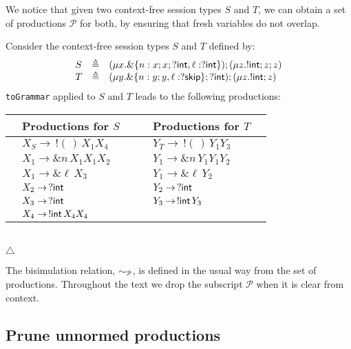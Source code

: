 We notice that given two context-free session types $S$ and $T$, we can obtain 
a set of productions $\mathcal{P}$ for both, by ensuring that fresh variables
do not overlap.

\begin{example}
\label{ex:productions}
	Consider the context-free session types $S$ and $T$ defined by: 
	\[\begin{array}{lll}
		S & \triangleq & (\mu x . \&\{n: x;x;?\mathsf{int}, \ell: ?\mathsf{int}\});(\mu z . !\mathsf{int} ; z;z)\\
		T & \triangleq & (\mu y . \&\{n: y;y, \ell: ?\mathsf{skip}\};?\mathsf{int});(\mu z . !\mathsf{int} ; z)
	\end{array}\]
	\lstinline{toGrammar} applied to $S$ and $T$ leads to the following productions:\\
	
	\centering
	\begin{tabular}{l l l |l l l}
    	&Productions for $S$& & & Productions for $T$& \\ \hline
    	&$X_S \rightarrow \,! (\,)\,X_1 X_4$ & & &$Y_T \rightarrow \,! (\,)\, Y_1 Y_3 $ &\\
    	&$X_1 \rightarrow \& n\, X_1 X_1 X_2$ & & &$Y_1 \rightarrow \& n\, Y_1 Y_1 Y_2 $ &\\
    	&$X_1 \rightarrow \& \ell\, X_3$ &&& $Y_1 \rightarrow \& \ell \,Y_2 $&\\
    	&$X_2 \rightarrow \,? \mathsf{int}$&&& $Y_2 \rightarrow \,? \mathsf{int}$&\\
    	&$X_3 \rightarrow \,? \mathsf{int}$&&& $Y_3 \rightarrow \,!\mathsf{int}\, Y_3$&\\
    	&$X_4 \rightarrow \,!\mathsf{int}\, X_4 X_4$ &&&&\\
  	\end{tabular}	\\
  	\hfill$\triangle$
\end{example}

The bisimulation relation, $\sim_{\mathcal{P}}$, is defined in the usual way from the 
set of productions. Throughout the text we drop the subscript $\mathcal{P}$ when 
it is clear from context.

\subsection{Prune unnormed productions}
\label{subsec:prune}

